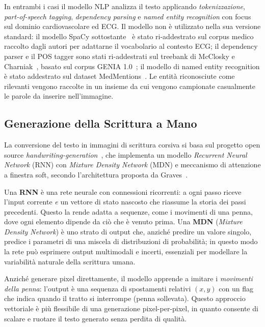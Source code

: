 In entrambi i casi il modello NLP analizza il testo applicando \textit{tokenizzazione}, \textit{part-of-speech tagging}, \textit{dependency parsing} e \textit{named entity recognition} con focus sul dominio cardiovascolare ed ECG. Il modello non è utilizzato nella sua versione standard: il modello SpaCy sottostante~\cite{honnibal2017spacy} è stato ri-addestrato sul corpus medico raccolto dagli autori per adattarne il vocabolario al contesto ECG; il dependency parser e il POS tagger sono stati ri-addestrati sul treebank di McClosky e Charniak~\cite{mcclosky2008}, basato sul corpus GENIA 1.0~\cite{kim2003genia}; il modello di named entity recognition è stato addestrato sul dataset MedMentions~\cite{mohan2019medmentions}. Le entità riconosciute come rilevanti vengono raccolte in un insieme da cui vengono campionate casualmente le parole da inserire nell'immagine.

\subsection{Generazione della Scrittura a Mano}

La conversione del testo in immagini di scrittura corsiva si basa sul progetto open source \textit{handwriting-generation}~\cite{grzego2016handwriting}, che implementa un modello \textit{Recurrent Neural Network} (RNN) con \textit{Mixture Density Network} (MDN) e meccanismo di attenzione a finestra soft, secondo l'architettura proposta da Graves~\cite{graves2013generating}.

Una \textbf{RNN} è una rete neurale con connessioni ricorrenti: a ogni passo riceve l'input corrente \textit{e} un vettore di stato nascosto che riassume la storia dei passi precedenti. Questo la rende adatta a sequenze, come i movimenti di una penna, dove ogni elemento dipende da ciò che è venuto prima. Una \textbf{MDN} (\textit{Mixture Density Network}) è uno strato di output che, anziché predire un valore singolo, predice i parametri di una miscela di distribuzioni di probabilità; in questo modo la rete può esprimere output multimodali e incerti, essenziali per modellare la variabilità naturale della scrittura umana.

Anziché generare pixel direttamente, il modello apprende a imitare i \textit{movimenti della penna}: l'output è una sequenza di spostamenti relativi $(x, y)$ con un flag che indica quando il tratto si interrompe (penna sollevata). Questo approccio vettoriale è più flessibile di una generazione pixel-per-pixel, in quanto consente di scalare e ruotare il testo generato senza perdita di qualità.


